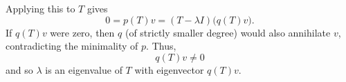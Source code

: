 \begin{prf}
Applying this to \(T\) gives
\[
0 = p(T)v = (T-\lambda I)\bigl(q(T)v\bigr).
\]
If \(q(T)v\) were zero, then \(q\) (of strictly smaller degree) would also annihilate \(v\), contradicting the minimality of \(p\).  Thus,
\[
q(T)v \neq 0
\]
and so \(\lambda\) is an eigenvalue of \(T\) with eigenvector \(q(T)v\).
%
%
\end{prf}



%

